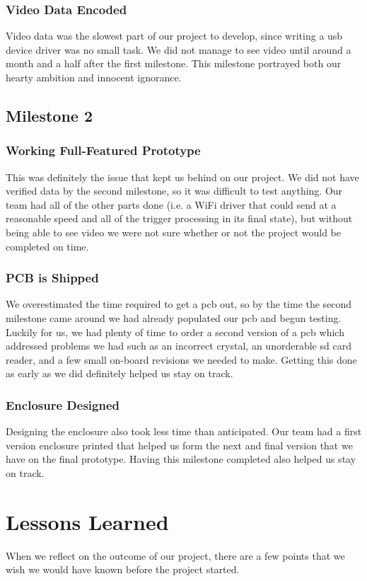 \documentclass[12pt]{article}
\begin{document}
\subsubsection{Video Data Encoded}
Video data was the slowest part of our project to develop, since writing a
\gls{usb} device driver was no small task. We did not manage to see video until
around a month and a half after the first milestone. This milestone portrayed
both our hearty ambition and innocent ignorance.

\subsection{Milestone 2}
\subsubsection{Working Full-Featured Prototype}
This was definitely the issue that kept us behind on our project. We did not
have verified data by the second milestone, so it was difficult to test
anything. Our team had all of the other parts done (i.e. a WiFi driver that
could send at a reasonable speed and all of the trigger processing in its final
state), but without being able to see video we were not sure whether or not the
project would be completed on time.

\subsubsection{PCB is Shipped}
We overestimated the time required to get a \gls{pcb} out, so by the time the
second milestone came around we had already populated our \gls{pcb} and begun
testing.  Luckily for us, we had plenty of time to order a second version of a
\gls{pcb} which addressed problems we had such as an incorrect crystal, an
unorderable \gls{sd} card reader, and a few small on-board revisions we needed
to make. Getting this done as early as we did definitely helped us stay on
track.

\subsubsection{Enclosure Designed}
Designing the enclosure also took less time than anticipated. Our team had a
first version enclosure printed that helped us form the next and final version
that we have on the final prototype. Having this milestone completed also
helped us stay on track.

\section{Lessons Learned}
When we reflect on the outcome of our project, there are a few points that we
wish we would have known before the project started.
\end{document}
